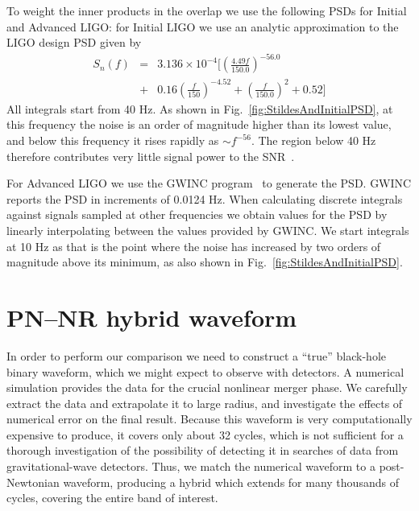 To weight the inner products in the overlap we use the
following PSDs for Initial and Advanced LIGO: for Initial LIGO we use
an analytic approximation to the LIGO design PSD given by
\begin{eqnarray}
  S_n(f) &= &3.136 \times 10^{-4} \bigg[
  \left(\frac{ 4.49 f}{150.0}\right)^{-56.0} \nonumber \\
  &+ & 0.16 \left(\frac{f}{150}\right)^{-4.52}
  + \left(\frac{f}{150.0}\right)^2 + 0.52
  \bigg]
\end{eqnarray}
All integrals start from 40 Hz.  As shown in
Fig.~\ref{fig:StildesAndInitialPSD}, at this frequency the noise is an
order of magnitude higher than its lowest value, and below this
frequency it rises rapidly as $\sim f^{-56}$.  The region below 40 Hz
therefore contributes very little signal power to the
SNR~\cite{Abbott:2007xi}.  

For Advanced LIGO we use the GWINC program~\cite{AdvancedLIGONoise} to
generate the PSD.  GWINC reports the PSD in increments of 0.0124 Hz.
When calculating discrete integrals against signals sampled at other
frequencies we obtain values for the PSD by linearly interpolating
between the values provided by GWINC.  We start integrals at 10 Hz as
that is the point where the noise has increased by two orders of
magnitude above its minimum, as also shown in
Fig.~\ref{fig:StildesAndInitialPSD}.




\section{PN--NR hybrid waveform}
\label{sec:PNNRHybridWaveform} %


In order to perform our comparison we need to construct a ``true''
black-hole binary waveform, which we might expect to observe with
detectors.  A numerical simulation provides the data for the crucial
nonlinear merger phase.  We carefully extract the data and extrapolate
it to large radius, and investigate the effects of numerical error on
the final result.  Because this waveform is very computationally
expensive to produce, it covers only about 32 cycles, which is not
sufficient for a thorough investigation of the possibility of
detecting it in searches of data from gravitational-wave detectors.
Thus, we match the numerical waveform to a post-Newtonian waveform,
producing a hybrid which extends for many thousands of cycles,
covering the entire band of interest.

